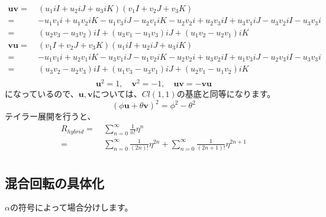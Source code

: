 \documentclass[a4paper,12pt,notitlepage]{jsreport}
\begin{document}
\begin{equation}
  \begin{split}
    \bm{u} \bm{v} = ~ & (u_1 iI + u_2 iJ + u_3 iK)(v_1 I + v_2 J + v_3 K) \\
    = ~ & - u_1 v_1 i + u_1 v_2 iK - u_1 v_3 iJ
    - u_2 v_1 iK - u_2 v_2 i + u_2 v_3 iI
    + u_3 v_1 iJ - u_3 v_2 iI - u_3 v_3 i \\
    = ~ & (u_2 v_3 - u_3 v_2) iI + (u_3 v_1 - u_1 v_3) iJ + (u_1 v_2 - u_2 v_1) iK \\
    \bm{v} \bm{u} = ~ & (v_1 I + v_2 J + v_3 K)(u_1 iI + u_2 iJ + u_3 iK) \\
    = ~ & - u_1 v_1 i + u_2 v_1 iK - u_3 v_1 iJ
    - u_1 v_2 iK - u_2 v_2 i + u_3 v_2 iI
    + u_1 v_3 iJ - u_2 v_3 iI - u_3 v_3 i \\
    = ~ & (u_3 v_2 - u_2 v_3) iI + (u_1 v_3 - u_3 v_1) iJ + (u_2 v_1 - u_1 v_2) iK \\
  \end{split}
\end{equation}
\begin{equation}
  \bm{u}^2 = 1 , \quad \bm{v}^2 = -1 , \quad \bm{u} \bm{v} = - \bm{v} \bm{u}
\end{equation}
になっているので、$ \bm{u}, \bm{v} $については、$ Cl(1,1) $の基底と同等になります。
\begin{equation}
  (\phi \bm{u} + \theta \bm{v})^2 = \phi^2 - \theta^2
\end{equation}
テイラー展開を行うと、
\begin{equation}
  \begin{split}
    R_{hybrid} = ~ & \sum_{n=0}^{∞} \frac{1}{n!} \eta^n \\
    = ~ & \sum_{n=0}^{∞} \frac{1}{(2n)!} \eta^{2n}
    + \sum_{n=0}^{∞} \frac{1}{(2n + 1)!} \eta^{2n + 1} \\
  \end{split}
\end{equation}

\subsection{混合回転の具体化}

$ \alpha $の符号によって場合分けします。
\end{document}
